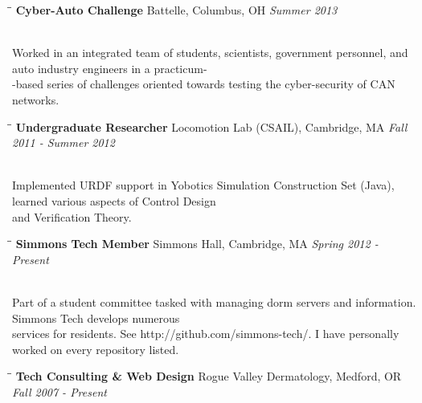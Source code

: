\documentclass{res}
\begin{document}
\begin{resume}
			\begin{tabbing}
				\hspace{2.3in}\= \hspace{2.6in}\= \kill %
				{\bf Cyber-Auto Challenge}	\>Battelle, Columbus, OH	\> \textit{Summer 2013}

                \\Worked in an integrated team of students, scientists, government personnel, and auto industry engineers in a practicum-
                \\-based series of challenges oriented towards testing the cyber-security of CAN networks. 
			\end{tabbing}\vspace{-20pt}

			\begin{tabbing}
				\hspace{2.3in}\= \hspace{2.6in}\= \kill %
				{\bf Undergraduate Researcher}	\>Locomotion Lab (CSAIL), Cambridge, MA	\> \textit{Fall 2011 - Summer 2012}

				\\Implemented URDF support in Yobotics Simulation Construction Set (Java), learned various aspects of
				Control Design
				\\and Verification Theory.

			\end{tabbing}\vspace{-20pt}

			\begin{tabbing}
				\hspace{2.3in}\= \hspace{2.6in}\= \kill %
				{\bf Simmons Tech Member}	\>Simmons Hall, Cambridge, MA	\> \textit{Spring 2012 - Present}

				\\Part of a student committee tasked with managing dorm servers and information. Simmons Tech develops numerous
				\\services for residents. See http://github.com/simmons-tech/. I have personally worked on every repository listed.

			\end{tabbing}\vspace{-20pt}

			\begin{tabbing}
				\hspace{2.3in}\= \hspace{2.6in}\= \kill %
				{\bf Tech Consulting \& Web Design}	\>Rogue Valley Dermatology, Medford, OR	\> \textit{Fall 2007 - Present}


\end{tabbing}
\end{resume}
\end{document}
